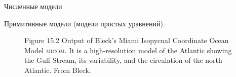 \begin{chapter}{Численные модели}
\begin{section}{Примитивные модели (модели простых уравнений).}
\begin{figure}[t!]
\begin{centering}
\end{centering}
\caption{Figure 15.2 Output of Bleck's Miami Isopycnal Coordinate
Ocean Model \textsc{micom}. It is a high-resolution model of the
Atlantic showing the Gulf Stream, its variability, and the circulation of the north
Atlantic. From Bleck.}
\label{fig:blecksgulfstream}
\end{figure}
%


\end{section}
\end{chapter}
